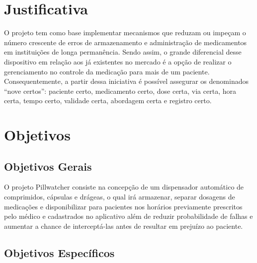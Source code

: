 \section{Justificativa}

O projeto tem como base implementar mecanismos que reduzam ou impeçam o número crescente de erros de armazenamento e administração de medicamentos em instituições de longa permanência. Sendo assim, o grande diferencial desse dispositivo em relação aos já existentes no mercado é a opção de realizar o gerenciamento no controle da medicação para mais de um paciente. Consequentemente, a partir dessa iniciativa  é possível assegurar os denominados “nove certos”: paciente certo, medicamento certo, dose certa, via certa, hora certa, tempo certo, validade certa, abordagem certa e registro certo.


\section{Objetivos}
\subsection{Objetivos Gerais}

O projeto Pillwatcher consiste na concepção de um dispensador automático de comprimidos, cápsulas e drágeas, o qual irá armazenar, separar dosagens de medicações e disponibilizar para pacientes nos horários previamente prescritos pelo médico e cadastrados no aplicativo além de reduzir probabilidade de falhas e aumentar a chance de interceptá-las antes de resultar em prejuízo ao paciente.



\subsection{Objetivos Específicos} \label{section:Obj_esp}

